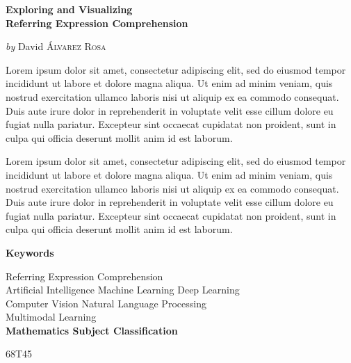 \cleardoublepage
\thispagestyle{plain}
\null\vfill

\begin{center}
  \Large
  \textbf{Exploring and Visualizing\\
    Referring Expression Comprehension}

  \vspace{2ex}
  \large
  \textit{by} David \textsc{Álvarez Rosa}

  \vspace{3ex}
  \textbf{\abstractname}
\end{center}

\vspace{-2ex}
\noindent Lorem ipsum dolor sit amet, consectetur adipiscing elit, sed do
eiusmod tempor incididunt ut labore et dolore magna aliqua. Ut enim ad minim
veniam, quis nostrud exercitation ullamco laboris nisi ut aliquip ex ea commodo
consequat. Duis aute irure dolor in reprehenderit in voluptate velit esse
cillum dolore eu fugiat nulla pariatur. Excepteur sint occaecat cupidatat non
proident, sunt in culpa qui officia deserunt mollit anim id est laborum.

Lorem ipsum dolor sit amet, consectetur adipiscing elit, sed do
eiusmod tempor incididunt ut labore et dolore magna aliqua. Ut enim ad minim
veniam, quis nostrud exercitation ullamco laboris nisi ut aliquip ex ea commodo
consequat. Duis aute irure dolor in reprehenderit in voluptate velit esse
cillum dolore eu fugiat nulla pariatur. Excepteur sint occaecat cupidatat non
proident, sunt in culpa qui officia deserunt mollit anim id est laborum.

\begin{center}


  \bigskip\smallskip
  \textbf{Keywords}

  Referring Expression Comprehension\\
  Artificial Intelligence \textbullet{} Machine Learning \textbullet{} Deep
  Learning\\
  Computer Vision \textbullet{} Natural Language Processing\\
  Multimodal Learning\\

  \bigskip
  \textbf{Mathematics Subject Classification}

  68T45
\end{center}

\vfill\null


\clearpage
\thispagestyle{plain}
\null\vfill

